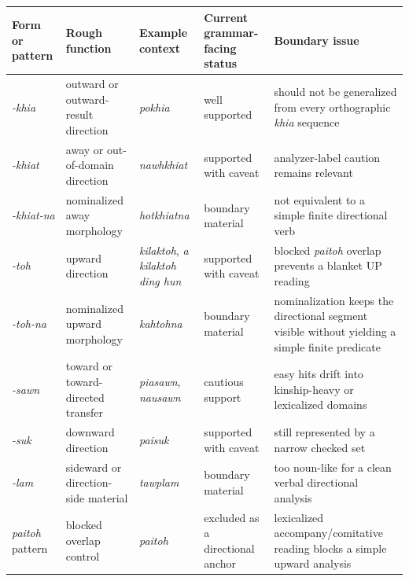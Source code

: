 \documentclass[
  11pt,
  a4paper,
]{article}
\newcounter{none} %
\newcommand{\tdim}[1]{\textit{#1}}
\begin{document}
{\def\LTcaptype{none} %
\begin{longtable}[]{@{}
  >{\raggedright\arraybackslash}p{}
  >{\raggedright\arraybackslash}p{}
  >{\raggedright\arraybackslash}p{}
  >{\raggedright\arraybackslash}p{}
  >{\raggedright\arraybackslash}p{}@{}}
\toprule\noalign{}
\begin{minipage}[b]{\linewidth}\raggedright
Form or pattern
\end{minipage} & \begin{minipage}[b]{\linewidth}\raggedright
Rough function
\end{minipage} & \begin{minipage}[b]{\linewidth}\raggedright
Example context
\end{minipage} & \begin{minipage}[b]{\linewidth}\raggedright
Current grammar-facing status
\end{minipage} & \begin{minipage}[b]{\linewidth}\raggedright
Boundary issue
\end{minipage} \\
\midrule\noalign{}
\endhead
\bottomrule\noalign{}
\endlastfoot
\tdim{-khia} & outward or outward-result direction & \tdim{pokhia} &
well supported & should not be generalized from every orthographic
\tdim{khia} sequence \\
\tdim{-khiat} & away or out-of-domain direction & \tdim{nawhkhiat} &
supported with caveat & analyzer-label caution remains relevant \\
\tdim{-khiat-na} & nominalized away morphology & \tdim{hotkhiatna} &
boundary material & not equivalent to a simple finite directional
verb \\
\tdim{-toh} & upward direction & \tdim{kilaktoh},
\tdim{a kilaktoh ding hun} & supported with caveat & blocked
\tdim{paitoh} overlap prevents a blanket UP reading \\
\tdim{-toh-na} & nominalized upward morphology & \tdim{kahtohna} &
boundary material & nominalization keeps the directional segment visible
without yielding a simple finite predicate \\
\tdim{-sawn} & toward or toward-directed transfer & \tdim{piasawn},
\tdim{nausawn} & cautious support & easy hits drift into kinship-heavy
or lexicalized domains \\
\tdim{-suk} & downward direction & \tdim{paisuk} & supported with caveat
& still represented by a narrow checked set \\
\tdim{-lam} & sideward or direction-side material & \tdim{tawplam} &
boundary material & too noun-like for a clean verbal directional
analysis \\
\tdim{paitoh} pattern & blocked overlap control & \tdim{paitoh} &
excluded as a directional anchor & lexicalized accompany/comitative
reading blocks a simple upward analysis \\
\end{longtable}
}
\end{document}
